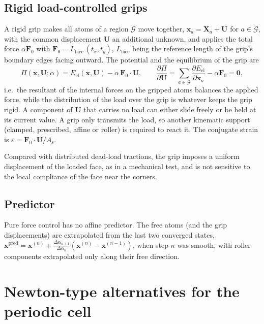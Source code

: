 \documentclass[11pt,a4paper]{article}
\newcommand{\x}{\mathbf x}
\newcommand{\X}{\mathbf X}
\newcommand{\U}{\mathbf U}
\begin{document}
\subsection{Rigid load-controlled grips}

A rigid grip makes all atoms of a region \(\mathcal G\) move together, \(\x_a=\X_a+\U\) for
\(a\in\mathcal G\), with the common displacement \(\U\) an additional unknown, and applies the total
force \(\alpha\mathbf F_0\) with \(\mathbf F_0=L_{\mathrm{face}}\,(t_x,t_y)\), \(L_{\mathrm{face}}\)
being the reference length of the grip's boundary edges facing outward. The potential and the
equilibrium of the grip are
\begin{equation}
  \Pi(\x,\U;\alpha)=E_{\mathrm{el}}(\x,\U)-\alpha\,\mathbf F_0\cdot\U,\qquad
  \frac{\partial\Pi}{\partial\U}=\sum_{a\in\mathcal G}\frac{\partial E_{\mathrm{el}}}{\partial\x_a}
  -\alpha\mathbf F_0=\mathbf 0 ,
\end{equation}
i.e.\ the resultant of the internal forces on the gripped atoms balances the applied force,
while the distribution of the load over the grip is whatever keeps the grip rigid. A component of
\(\U\) that carries no load can either slide freely or be held at its current value. A grip only
transmits the load, so another kinematic support (clamped, prescribed, affine or roller) is
required to react it. The conjugate strain is \(\varepsilon=\mathbf F_0\cdot\U/A_{\mathrm s}\).

Compared with distributed dead-load tractions, the grip imposes a uniform displacement of the
loaded face, as in a mechanical test, and is not sensitive to the local compliance of the face
near the corners.

\subsection{Predictor}

Pure force control has no affine predictor. The free atoms (and the grip displacements) are
extrapolated from the last two converged states,
\(\x^{\mathrm{pred}}=\x^{(n)}+\frac{\Delta\alpha_{n+1}}{\Delta\alpha_n}(\x^{(n)}-\x^{(n-1)})\), when
step \(n\) was smooth, with roller components extrapolated only along their free direction.

\section{Newton-type alternatives for the periodic cell}
\label{sec:newton}
\end{document}
